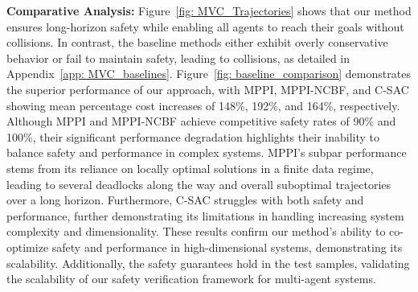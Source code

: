 \textbf{Comparative Analysis:} Figure~\ref{fig: MVC_Trajectories} shows that our method ensures long-horizon safety while enabling all agents to reach their goals without collisions. In contrast, the baseline methods either exhibit overly conservative behavior or fail to maintain safety, leading to collisions, as detailed in Appendix~\ref{app: MVC_baselines}. Figure~\ref{fig: baseline_comparison} demonstrates the superior performance of our approach, with MPPI, MPPI-NCBF, and C-SAC showing mean percentage cost increases of 148\%, 192\%, and 164\%, respectively. Although MPPI and MPPI-NCBF achieve competitive safety rates of 90\% and 100\%, their significant performance degradation highlights their inability to balance safety and performance in complex systems. MPPI's subpar performance stems from its reliance on locally optimal solutions in a finite data regime, leading to several deadlocks along the way and overall suboptimal trajectories over a long horizon. Furthermore, C-SAC struggles with both safety and performance, further demonstrating its limitations in handling increasing system complexity and dimensionality. These results confirm our method's ability to co-optimize safety and performance in high-dimensional systems, demonstrating its scalability. Additionally, the safety guarantees hold in the test samples, validating the scalability of our safety verification framework for multi-agent systems.



